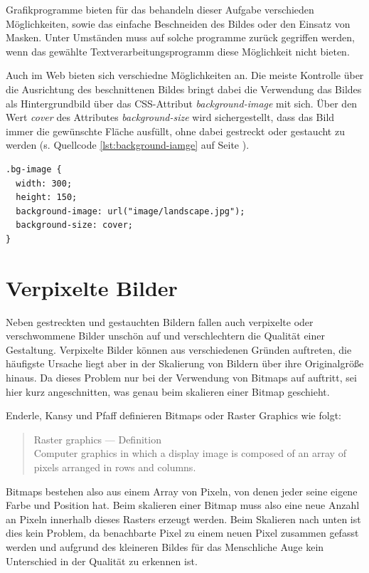 Grafikprogramme bieten für das behandeln dieser Aufgabe verschieden Möglichkeiten, sowie das einfache Beschneiden des Bildes oder den Einsatz von Masken. Unter Umständen muss auf solche programme zurück gegriffen werden, wenn das gewählte Textverarbeitungsprogramm diese Möglichkeit nicht bieten.

Auch im Web bieten sich verschiedne Möglichkeiten an. Die meiste Kontrolle über die Ausrichtung des beschnittenen Bildes bringt dabei die Verwendung das Bildes als Hintergrundbild über das CSS-Attribut \textit{background-image} mit sich. Über den Wert \textit{cover} des Attributes \textit{background-size} wird sichergestellt, dass das Bild immer die gewünschte Fläche ausfüllt, ohne dabei gestreckt oder gestaucht zu werden (s. Quellcode \ref{lst:background-iamge} auf Seite \pageref{lst:background-iamge}).

\begin{lstlisting}[caption={Verwendung eines Hintergrundbildes in CSS},label={lst:background-iamge}]
.bg-image {
  width: 300;
  height: 150;
  background-image: url("image/landscape.jpg");
  background-size: cover;
}
\end{lstlisting}

\section{Verpixelte Bilder}
Neben gestreckten und gestauchten Bildern fallen auch verpixelte oder verschwommene Bilder unschön auf und verschlechtern die Qualität einer Gestaltung. Verpixelte Bilder können aus verschiedenen Gründen auftreten, die häufigste Ursache liegt aber in der Skalierung von Bildern über ihre Originalgröße hinaus. 
Da dieses Problem nur bei der Verwendung von Bitmaps auf auftritt, sei hier kurz angeschnitten, was genau beim skalieren einer Bitmap geschieht.

Enderle, Kansy und Pfaff definieren Bitmaps oder Raster Graphics wie folgt:

\begin{quote}
Raster graphics — Definition \\
Computer graphics in which a display image is composed of an array of pixels arranged in rows and columns. \cite{enderle2012computer}
\end{quote}

Bitmaps bestehen also aus einem Array von Pixeln, von denen jeder seine eigene Farbe und Position hat.
Beim skalieren einer Bitmap muss also eine neue Anzahl an Pixeln innerhalb dieses Rasters erzeugt werden. Beim Skalieren nach unten ist dies kein Problem, da benachbarte Pixel zu einem neuen Pixel zusammen gefasst werden und aufgrund des kleineren Bildes für das Menschliche Auge kein Unterschied in der Qualität zu erkennen ist.


